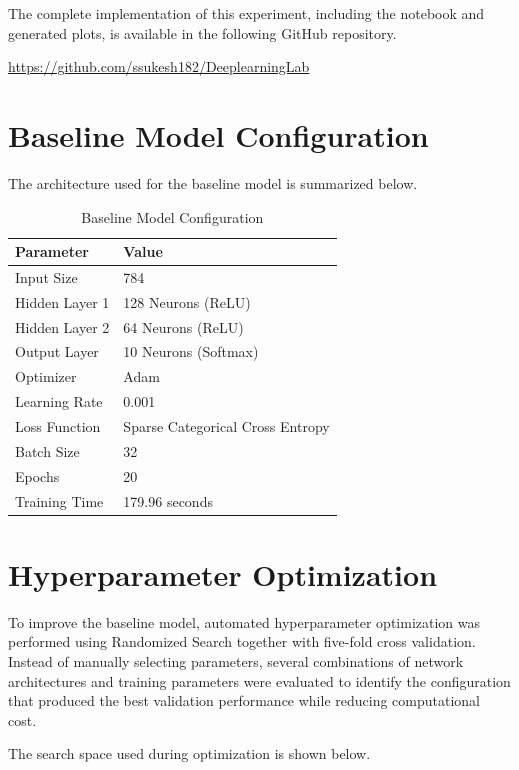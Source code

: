 \documentclass[12pt,a4paper]{article}
\begin{document}
The complete implementation of this experiment, including the notebook and generated plots, is available in the following GitHub repository.

\bigskip

\url{https://github.com/ssukesh182/DeeplearningLab}

\section{Baseline Model Configuration}

The architecture used for the baseline model is summarized below.

\begin{table}[H]
\centering
\caption{Baseline Model Configuration}
\begin{tabular}{ll}
\toprule
Parameter & Value\\
\midrule
Input Size & 784\\
Hidden Layer 1 & 128 Neurons (ReLU)\\
Hidden Layer 2 & 64 Neurons (ReLU)\\
Output Layer & 10 Neurons (Softmax)\\
Optimizer & Adam\\
Learning Rate & 0.001\\
Loss Function & Sparse Categorical Cross Entropy\\
Batch Size & 32\\
Epochs & 20\\
Training Time & 179.96 seconds\\
\bottomrule
\end{tabular}
\end{table}

\section{Hyperparameter Optimization}

To improve the baseline model, automated hyperparameter optimization was performed using Randomized Search together with five-fold cross validation. Instead of manually selecting parameters, several combinations of network architectures and training parameters were evaluated to identify the configuration that produced the best validation performance while reducing computational cost.

The search space used during optimization is shown below.
\end{document}
